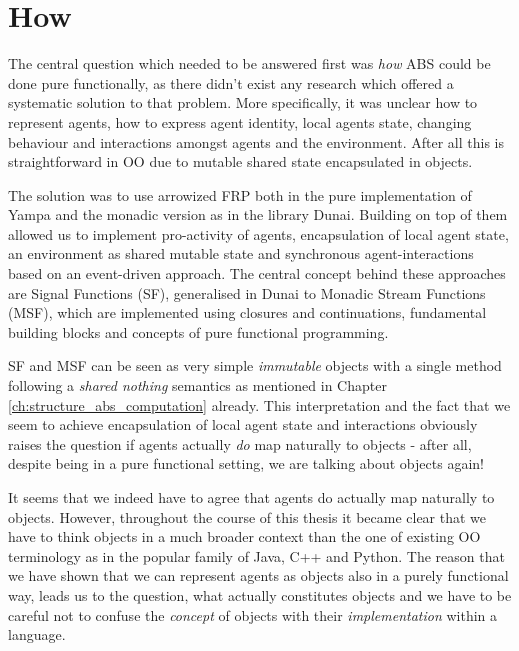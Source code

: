 \section{How}
The central question which needed to be answered first was \textit{how} ABS could be done pure functionally, as there didn't exist any research which offered a systematic solution to that problem. More specifically, it was unclear how to represent agents, how to express agent identity, local agents state, changing behaviour and interactions amongst agents and the environment. After all this is straightforward in OO due to mutable shared state encapsulated in objects.

The solution was to use arrowized FRP both in the pure implementation of Yampa and the monadic version as in the library Dunai. Building on top of them allowed us to implement pro-activity of agents, encapsulation of local agent state, an environment as shared mutable state and synchronous agent-interactions based on an event-driven approach. The central concept behind these approaches are Signal Functions (SF), generalised in Dunai to Monadic Stream Functions (MSF), which are implemented using closures and continuations, fundamental building blocks and concepts of pure functional programming. 


SF and MSF can be seen as very simple \textit{immutable} objects with a single method following a \textit{shared nothing} semantics as mentioned in Chapter \ref{ch:structure_abs_computation} already. This interpretation and the fact that we seem to achieve encapsulation of local agent state and interactions obviously raises the question if agents actually \textit{do} map naturally to objects - after all, despite being in a pure functional setting, we are talking about objects again!

It seems that we indeed have to agree that agents do actually map naturally to objects. However, throughout the course of this thesis it became clear that we have to think objects in a much broader context than the one of existing OO terminology as in the popular family of Java, C++ and Python. The reason that we have shown that we can represent agents as objects also in a purely functional way, leads us to the question, what actually constitutes objects and we have to be careful not to confuse the \textit{concept} of objects with their \textit{implementation} within a language.

